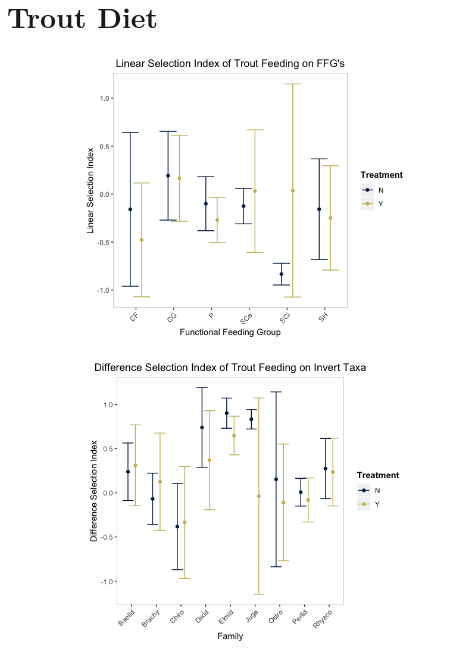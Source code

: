 \documentclass[double,12pt]{beavtex}
\begin{document}
  \begin{table}[t]
  
  \caption{\label{tab:ffgtable}BACI t-test Results for Invertebrate FFG's}
  \centering
  \end{table}
  
  \section*{Trout Diet}\label{trout-diet}
  
  \begin{figure}[htbp]
  \centering
  \includegraphics[width=4.16667in]{Final_Figures_and_Stats_files/figure-html/Diet-FFG-D-1.png}
  \caption{}
  \end{figure}
  
  \begin{figure}[htbp]
  \centering
  \includegraphics[width=4.16667in]{Final_Figures_and_Stats_files/figure-html/Diet-Fam-D-1.png}
  \caption{}
  \end{figure}
  
\end{document}
